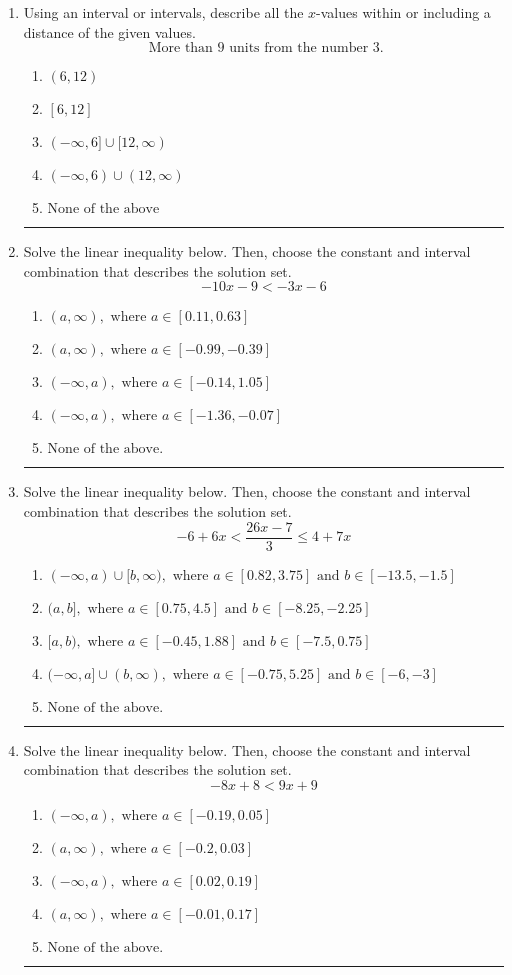 \documentclass[14pt]{extbook}
\newcommand{\litem}[1]{\item#1\hspace*{-1cm}\rule{\textwidth}{0.4pt}}
\begin{document}
\begin{enumerate}
\litem{
Using an interval or intervals, describe all the $x$-values within or including a distance of the given values.\[ \text{ More than } 9 \text{ units from the number } 3. \]\begin{enumerate}[label=\Alph*.]
\item \( (6, 12) \)
\item \( [6, 12] \)
\item \( (-\infty, 6] \cup [12, \infty) \)
\item \( (-\infty, 6) \cup (12, \infty) \)
\item \( \text{None of the above} \)

\end{enumerate} }
\litem{
Solve the linear inequality below. Then, choose the constant and interval combination that describes the solution set.\[ -10x -9 < -3x -6 \]\begin{enumerate}[label=\Alph*.]
\item \( (a, \infty), \text{ where } a \in [0.11, 0.63] \)
\item \( (a, \infty), \text{ where } a \in [-0.99, -0.39] \)
\item \( (-\infty, a), \text{ where } a \in [-0.14, 1.05] \)
\item \( (-\infty, a), \text{ where } a \in [-1.36, -0.07] \)
\item \( \text{None of the above}. \)

\end{enumerate} }
\litem{
Solve the linear inequality below. Then, choose the constant and interval combination that describes the solution set.\[ -6 + 6 x < \frac{26 x - 7}{3} \leq 4 + 7 x \]\begin{enumerate}[label=\Alph*.]
\item \( (-\infty, a) \cup [b, \infty), \text{ where } a \in [0.82, 3.75] \text{ and } b \in [-13.5, -1.5] \)
\item \( (a, b], \text{ where } a \in [0.75, 4.5] \text{ and } b \in [-8.25, -2.25] \)
\item \( [a, b), \text{ where } a \in [-0.45, 1.88] \text{ and } b \in [-7.5, 0.75] \)
\item \( (-\infty, a] \cup (b, \infty), \text{ where } a \in [-0.75, 5.25] \text{ and } b \in [-6, -3] \)
\item \( \text{None of the above.} \)

\end{enumerate} }
\litem{
Solve the linear inequality below. Then, choose the constant and interval combination that describes the solution set.\[ -8x + 8 < 9x + 9 \]\begin{enumerate}[label=\Alph*.]
\item \( (-\infty, a), \text{ where } a \in [-0.19, 0.05] \)
\item \( (a, \infty), \text{ where } a \in [-0.2, 0.03] \)
\item \( (-\infty, a), \text{ where } a \in [0.02, 0.19] \)
\item \( (a, \infty), \text{ where } a \in [-0.01, 0.17] \)
\item \( \text{None of the above}. \)


\end{enumerate}}
\end{enumerate}
\end{document}
